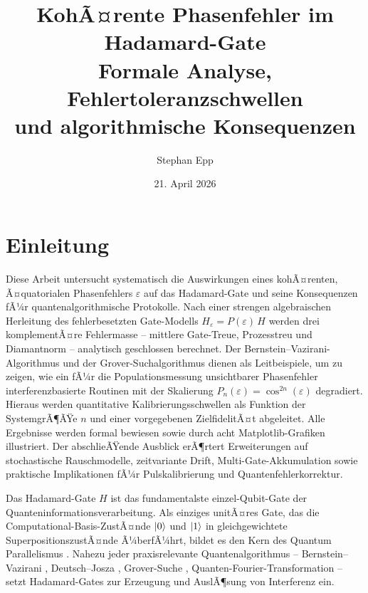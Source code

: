 ﻿\documentclass[11pt,a4paper]{article}
\title{{\bfseries KohÃ¤rente Phasenfehler im Hadamard-Gate}\\[-0.1em]
  \Large Formale Analyse, Fehlertoleranzschwellen\\[-0.1em]
  und algorithmische Konsequenzen}
\date{21. April 2026}
\author{Stephan Epp}
\theoremstyle{definition}
\newcommand{\eps}{\varepsilon}
\begin{document}
\maketitle
\tableofcontents
\newpage

\section{Einleitung}
\label{sec:intro}
Diese Arbeit untersucht systematisch die Auswirkungen eines kohÃ¤renten,
Ã¤quatorialen Phasenfehlers $\varepsilon$ auf das Hadamard-Gate und seine
Konsequenzen fÃ¼r quantenalgorithmische Protokolle.  Nach einer strengen
algebraischen Herleitung des fehlerbesetzten Gate-Modells
$H_\varepsilon = P(\varepsilon)\,H$ werden drei komplementÃ¤re
Fehlermasse -- mittlere Gate-Treue, Prozesstreu und Diamantnorm --
analytisch geschlossen berechnet.  Der Bernstein--Vazirani-Algorithmus
und der Grover-Suchalgorithmus dienen als Leitbeispiele, um zu zeigen,
wie ein fÃ¼r die Populationsmessung unsichtbarer Phasenfehler
interferenzbasierte Routinen mit der Skalierung
$P_n(\eps) = \cos^{2n}(\eps)$ degradiert.  Hieraus werden quantitative
Kalibrierungsschwellen als Funktion der SystemgrÃ¶ÃŸe $n$ und einer
vorgegebenen ZielfidelitÃ¤t abgeleitet. Alle Ergebnisse werden formal
bewiesen sowie durch acht Matplotlib-Grafiken illustriert.  Der
abschlieÃŸende Ausblick erÃ¶rtert Erweiterungen auf stochastische
Rauschmodelle, zeitvariante Drift, Multi-Gate-Akkumulation sowie
praktische Implikationen fÃ¼r Pulskalibrierung und Quantenfehlerkorrektur.

Das Hadamard-Gate $H$ ist das fundamentalste einzel-Qubit-Gate der
Quanteninformationsverarbeitung.  Als einziges unitÃ¤res Gate, das die
Computational-Basis-ZustÃ¤nde $\ket{0}$ und $\ket{1}$ in gleichgewichtete
SuperpositionszustÃ¤nde Ã¼berfÃ¼hrt, bildet es den Kern des Quantum
Parallelismus \cite{Nielsen2000}.  Nahezu jeder praxisrelevante
Quantenalgorithmus -- Bernstein--Vazirani \cite{BV1993}, Deutsch--Josza
\cite{Deutsch1992}, Grover-Suche \cite{Grover1996}, Quanten-Fourier-Transformation
\cite{Coppersmith1994} -- setzt Hadamard-Gates zur Erzeugung und AuslÃ¶sung
von Interferenz ein.
\end{document}
